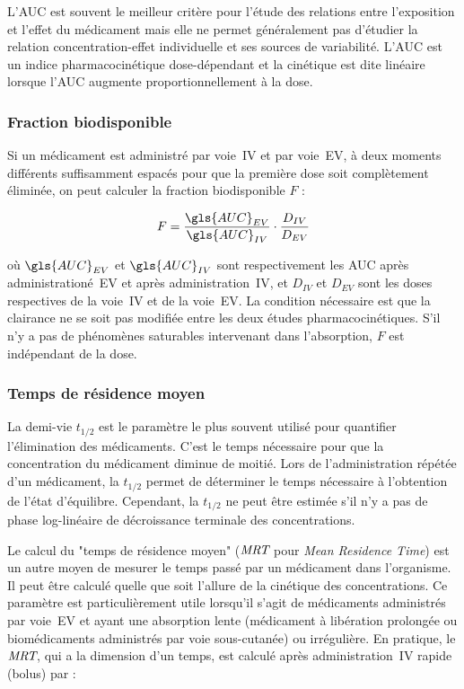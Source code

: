L'\gls{AUC} est souvent le meilleur critère pour l'étude des relations entre l'exposition et l'effet du médicament mais elle ne permet généralement pas d'étudier la relation concentration-effet individuelle et ses sources de variabilité. L'\gls{AUC} est un indice pharmacocinétique dose-dépendant et la cinétique est dite linéaire lorsque l'\gls{AUC} augmente proportionnellement à la dose.

\subsubsection{Fraction biodisponible}
Si un médicament est administré par voie~IV et par voie~EV, à deux moments différents suffisamment espacés pour que la première dose soit complètement éliminée, on peut calculer la fraction biodisponible $F$ :

\begin{equation}
F = \frac{\gls{AUC}_{EV}}{\gls{AUC}_{IV}} \cdot \frac{D_{IV}}{D_{EV}}
\label{eq:5}
\end{equation}

où $\gls{AUC}_{EV}$ et $\gls{AUC}_{IV}$ sont respectivement les \gls{AUC} après administrationé~EV et après administration~IV, et $D_{IV}$ et $D_{EV}$ sont les doses respectives de la voie~IV et de la voie~EV. La condition nécessaire est que la clairance ne se soit pas modifiée entre les deux études pharmacocinétiques. S'il n'y a pas de phénomènes saturables intervenant dans l'absorption, $F$ est indépendant de la dose.

\subsubsection{Temps de résidence moyen} 
La demi-vie $t_{1/2}$ est le paramètre le plus souvent utilisé pour quantifier l'élimination des médicaments. C'est le temps nécessaire pour que la concentration du médicament diminue de moitié. Lors de l'administration répétée d'un médicament, la $t_{1/2}$ permet de déterminer le temps nécessaire à l'obtention de l'état d'équilibre. Cependant, la $t_{1/2}$ ne peut être estimée s'il n'y a pas de phase log-linéaire de décroissance terminale des concentrations.

Le calcul du "temps de résidence moyen" ($\operatorname{\textit{MRT}}$ pour \textit{Mean Residence Time}) est un autre moyen de mesurer le temps passé par un médicament dans l'organisme. Il peut être calculé quelle que soit l'allure de la cinétique des concentrations. Ce paramètre est particulièrement utile lorsqu'il s'agit de médicaments administrés par voie~EV et ayant une absorption lente (médicament à libération prolongée ou biomédicaments administrés par voie sous-cutanée) ou irrégulière. En pratique, le $\operatorname{\textit{MRT}}$, qui a la dimension d'un temps, est calculé après administration~IV rapide (bolus) par :

